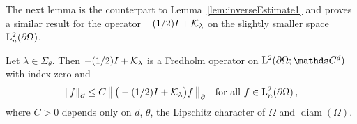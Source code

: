 The next lemma is the counterpart to Lemma~\ref{lem:inverseEstimate1} and proves a similar result for the operator $-(1/2)I + \mathcal{K}_\lambda$ on the slightly smaller space $\mathrm{L}^2_n(\partial\Omega)$.

\begin{lem}
  \label{lem:inverseEstimate}
  Let $\lambda \in \Sigma_\theta$.
  Then $-(1/2)I + \mathcal{K}_\lambda$ is a Fredholm operator on $\Ell^2(\partial\Omega; \C^d)$ with index zero and
  \begin{align}
    \label{eq:inverseEstimate2}
    \| f\|^{}_\partial \leq C \, \big\| \, \big( - (1/2) I + \mathcal{K}_\lambda \big) f\, \big\|^{}_\partial \quad\text{for all } f \in \mathrm{L}^2_n(\partial\Omega)\,,
  \end{align}
  where $C > 0$ depends only on $d$, $\theta$, the Lipschitz character of $\Omega$ and $\operatorname{diam}(\Omega)$.
\end{lem}

